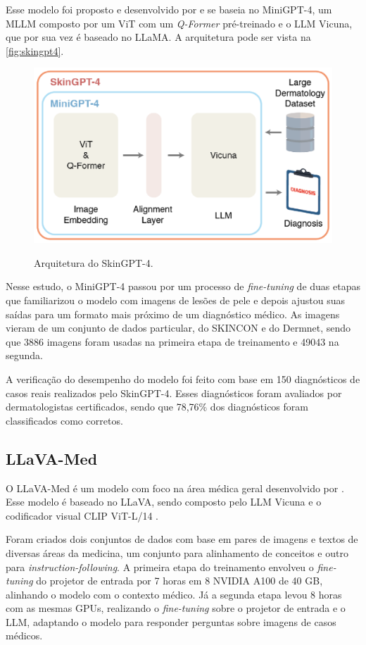 Esse modelo foi proposto e desenvolvido por \textcite{zhou2023skingpt} e se baseia no Mini\ac{GPT}-4, um \ac{MLLM} composto por um \ac{ViT} com um \textit{Q-Former}
pré-treinado e o \ac{LLM} Vicuna, que por sua vez é baseado no \ac{LLaMA}. A arquitetura pode ser vista na \autoref{fig:skingpt4}.

\begin{figure}[ht]
    \centering
    \caption{\small Arquitetura do Skin\ac{GPT}-4.}
    \includegraphics[width=0.55\columnwidth,keepaspectratio]{images/skingpt4.png}
    \label{fig:skingpt4}
\end{figure}

Nesse estudo, o Mini\ac{GPT}-4 passou por um processo de \textit{fine-tuning} de duas etapas que familiarizou o modelo com imagens de lesões de pele e depois ajustou suas
saídas para um formato mais próximo de um diagnóstico médico. As imagens vieram de um conjunto de dados particular, do SKINCON e do Dermnet, sendo que 3886 imagens foram
usadas na primeira etapa de treinamento e 49043 na segunda.

A verificação do desempenho do modelo foi feito com base em 150 diagnósticos de casos reais realizados pelo Skin\ac{GPT}-4. Esses diagnósticos foram avaliados por
dermatologistas certificados, sendo que 78,76\% dos diagnósticos foram classificados como corretos.

\subsection{LLaVA-Med}

O \ac{LLaVA}-Med é um modelo com foco na área médica geral desenvolvido por \textcite{li2024llava}. Esse modelo é baseado no \ac{LLaVA}, sendo composto pelo \ac{LLM}
Vicuna e o codificador visual \ac{CLIP} \ac{ViT}-L/14 \cite{liu2024visual}.

Foram criados dois conjuntos de dados com base em pares de imagens e textos de diversas áreas da medicina, um conjunto para alinhamento de conceitos e outro para
\textit{instruction-following}. A primeira etapa do treinamento envolveu o \textit{fine-tuning} do projetor de entrada por 7 horas em 8 NVIDIA A100 de 40 GB, alinhando
o modelo com o contexto médico. Já a segunda etapa levou 8 horas com as mesmas GPUs, realizando o \textit{fine-tuning} sobre o projetor de entrada e o \ac{LLM}, adaptando
o modelo para responder perguntas sobre imagens de casos médicos.

